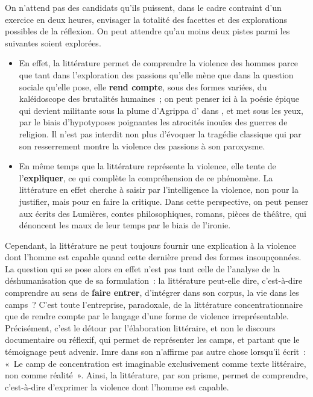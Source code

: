 {On n'attend pas des candidats qu'ils puissent, dans le cadre contraint d'un exercice
en deux heures, envisager la totalité des facettes et des explorations possibles de la
réflexion. On peut attendre qu'au moins deux pistes parmi les suivantes soient
explorées.

\begin{itemize}
\item En effet, la littérature permet de comprendre la violence des hommes parce que
tant dans l'exploration des passions qu'elle mène que dans la question sociale
qu'elle pose, elle \textbf{rend compte}, sous des formes variées, du kaléidoscope des
brutalités humaines~; on peut penser ici à la poésie épique qui devient militante
sous la plume d'Agrippa d' dans , et met sous les yeux,
par le biais d'hypotyposes poignantes les atrocités inouïes des guerres de
religion. Il n'est pas interdit non plus d'évoquer la tragédie classique qui par son
resserrement montre la violence des passions à son paroxysme.
\item En même temps que la littérature représente la violence, elle tente de
l'\textbf{expliquer}, ce qui complète la compréhension de ce phénomène. La littérature
en effet cherche à saisir par l'intelligence la violence, non pour la justifier, mais
pour en faire la critique. Dans cette perspective, on peut penser aux écrits des
Lumières, contes philosophiques, romans, pièces de théâtre, qui dénoncent les
maux de leur temps par le biais de l'ironie.
\end{itemize}

Cependant, la littérature ne peut toujours fournir une explication à la violence dont
l'homme est capable quand cette dernière prend des formes insoupçonnées. La
question qui se pose alors en effet n'est pas tant celle de l'analyse de la
déshumanisation que de sa formulation~: la littérature peut-elle dire, c'est-à-dire
comprendre au sens de \textbf{faire entrer}, d'intégrer dans son corpus, la vie dans les
camps~? C'est toute l'entreprise, paradoxale, de la littérature concentrationnaire que
de rendre compte par le langage d'une forme de violence irreprésentable.
Précisément, c'est le détour par l'élaboration littéraire, et non le discours documentaire
ou réflexif, qui permet de représenter les camps, et partant que le témoignage peut
advenir. Imre  dans son  n'affirme pas autre chose lorsqu'il
écrit~: «~Le camp de concentration est imaginable exclusivement comme texte
littéraire, non comme réalité~». Ainsi, la littérature, par son prisme, permet de
comprendre, c'est-à-dire d'exprimer la violence dont l'homme est capable.}

